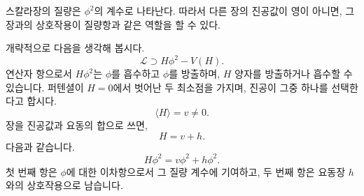 스칼라장의 질량은 \(\phi^2\)의 계수로 나타난다. 따라서 다른 장의 진공값이 영이 아니면, 그 장과의 상호작용이 질량항과 같은 역할을 할 수 있다.

\begin{classroomqa}
\end{classroomqa}

개략적으로 다음을 생각해 봅시다.
\begin{equation}
\mathcal L\supset H\phi^2-V(H).
\end{equation}
연산자 항으로서 \(H\phi^2\)는 \(\phi\)를 흡수하고 \(\phi\)를 방출하며, \(H\) 양자를 방출하거나 흡수할 수 있습니다. 퍼텐셜이 \(H=0\)에서 벗어난 두 최소점을 가지며, 진공이 그중 하나를 선택한다고 합시다.
\begin{equation}
\langle H\rangle=v\ne0.
\end{equation}
장을 진공값과 요동의 합으로 쓰면,
\begin{equation}
H=v+h.
\end{equation}
다음과 같습니다.
\begin{equation}
H\phi^2=v\phi^2+h\phi^2.
\end{equation}
첫 번째 항은 \(\phi\)에 대한 이차항으로서 그 질량 계수에 기여하고, 두 번째 항은 요동장 \(h\)와의 상호작용으로 남습니다.

\begin{classroomqa}
\end{classroomqa}

